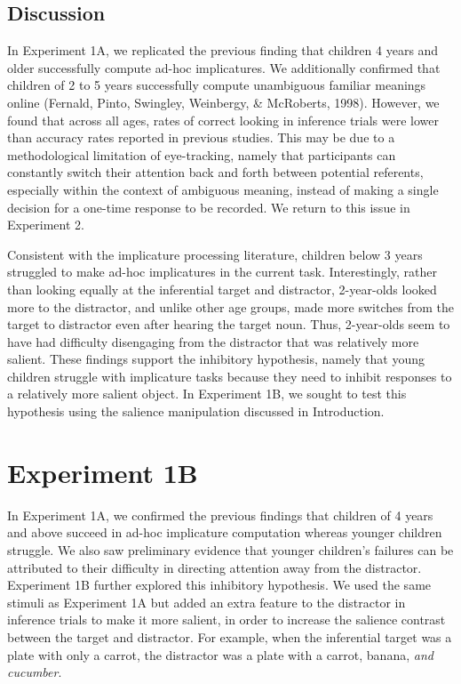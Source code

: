 \documentclass[a4paper,man,apacite,floatsintext]{apa6}
\begin{document}
\subsection{Discussion}\label{discussion}

In Experiment 1A, we replicated the previous finding that children 4
years and older successfully compute ad-hoc implicatures. We
additionally confirmed that children of 2 to 5 years successfully
compute unambiguous familiar meanings online (Fernald, Pinto, Swingley,
Weinbergy, \& McRoberts, 1998). However, we found that across all ages,
rates of correct looking in inference trials were lower than accuracy
rates reported in previous studies. This may be due to a methodological
limitation of eye-tracking, namely that participants can constantly
switch their attention back and forth between potential referents,
especially within the context of ambiguous meaning, instead of making a
single decision for a one-time response to be recorded. We return to
this issue in Experiment 2.

Consistent with the implicature processing literature, children below 3
years struggled to make ad-hoc implicatures in the current task.
Interestingly, rather than looking equally at the inferential target and
distractor, 2-year-olds looked more to the distractor, and unlike other
age groups, made more switches from the target to distractor even after
hearing the target noun. Thus, 2-year-olds seem to have had difficulty
disengaging from the distractor that was relatively more salient. These
findings support the inhibitory hypothesis, namely that young children
struggle with implicature tasks because they need to inhibit responses
to a relatively more salient object. In Experiment 1B, we sought to test
this hypothesis using the salience manipulation discussed in
Introduction.

\section{Experiment 1B}\label{experiment-1b}

In Experiment 1A, we confirmed the previous findings that children of 4
years and above succeed in ad-hoc implicature computation whereas
younger children struggle. We also saw preliminary evidence that younger
children's failures can be attributed to their difficulty in directing
attention away from the distractor. Experiment 1B further explored this
inhibitory hypothesis. We used the same stimuli as Experiment 1A but
added an extra feature to the distractor in inference trials to make it
more salient, in order to increase the salience contrast between the
target and distractor. For example, when the inferential target was a
plate with only a carrot, the distractor was a plate with a carrot,
banana, \emph{and cucumber}.
\end{document}

